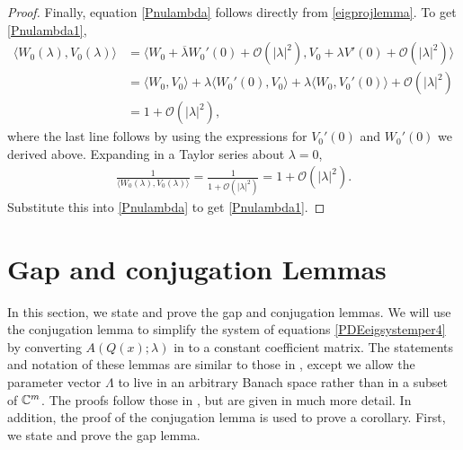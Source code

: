 \documentclass[thesis.tex]{subfiles}
\begin{document}
\begin{lemma}
\begin{proof}
Finally, equation \cref{Pnulambda} follows directly from \cref{eigprojlemma}. To get \cref{Pnulambda1},
\begin{align*}
\langle W_0(\lambda), V_0(\lambda) \rangle
&= \langle W_0 + \overline{\lambda} W_0'(0) + \mathcal{O}(|\lambda|^2),
V_0 + \lambda V'(0) + \mathcal{O}(|\lambda|^2) \rangle \\
&= \langle W_0, V_0 \rangle + \lambda \langle W_0'(0), V_0 \rangle + \lambda \langle W_0, V_0'(0) \rangle + \mathcal{O}(|\lambda|^2) \\
&= 1 + \mathcal{O}(|\lambda|^2),
\end{align*}
where the last line follows by using the expressions for $V_0'(0)$ and $W_0'(0)$ we derived above. Expanding in a Taylor series about $\lambda = 0$,
\begin{align*}
\frac{1}{\langle W_0(\lambda), V_0(\lambda) \rangle} = \frac{1}{1 + \mathcal{O}(|\lambda|^2)} = 1 + \mathcal{O}(|\lambda|^2).
\end{align*}
Substitute this into \cref{Pnulambda} to get \cref{Pnulambda1}.

\end{proof}
\end{lemma}

\section{Gap and conjugation Lemmas}

In this section, we state and prove the gap and conjugation lemmas. We will use the conjugation lemma to simplify the system of equations \cref{PDEeigsystemper4} by converting $A(Q(x); \lambda)$ in to a constant coefficient matrix. The statements and notation of these lemmas are similar to those in \cite{Zumbrun2009}, except we allow the parameter vector $\Lambda$ to live in an arbitrary Banach space rather than in a subset of $\mathbb{C}^m$. The proofs follow those in \cite{Zumbrun2009}, but are given in much more detail. In addition, the proof of the conjugation lemma is used to prove a corollary. First, we state and prove the gap lemma.
\end{document}
